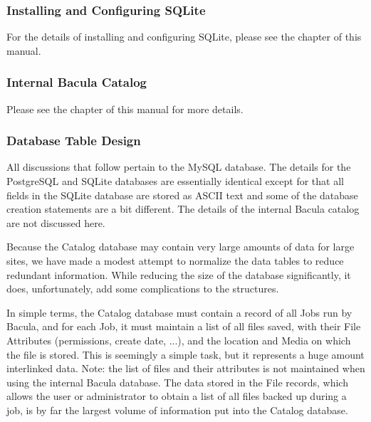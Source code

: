 {{{\subsubsection*{Installing and Configuring SQLite}

For the details of installing and configuring SQLite, please see the 
 chapter of
this manual. 

\subsubsection*{Internal Bacula Catalog}

Please see the 
 chapter of this
manual for more details. 

\subsubsection*{Database Table Design}

All discussions that follow pertain to the MySQL database. The details for the
PostgreSQL and SQLite databases are essentially identical except for that all
fields in the SQLite database are stored as ASCII text and some of the
database creation statements are a bit different. The details of the internal
Bacula catalog are not discussed here. 

Because the Catalog database may contain very large amounts of data for large
sites, we have made a modest attempt to normalize the data tables to reduce
redundant information. While reducing the size of the database significantly,
it does, unfortunately, add some complications to the structures. 

In simple terms, the Catalog database must contain a record of all Jobs run by
Bacula, and for each Job, it must maintain a list of all files saved, with
their File Attributes (permissions, create date, ...), and the location and
Media on which the file is stored. This is seemingly a simple task, but it
represents a huge amount interlinked data. Note: the list of files and their
attributes is not maintained when using the internal Bacula database. The data
stored in the File records, which allows the user or administrator to obtain a
list of all files backed up during a job, is by far the largest volume of
information put into the Catalog database. 

}}}
